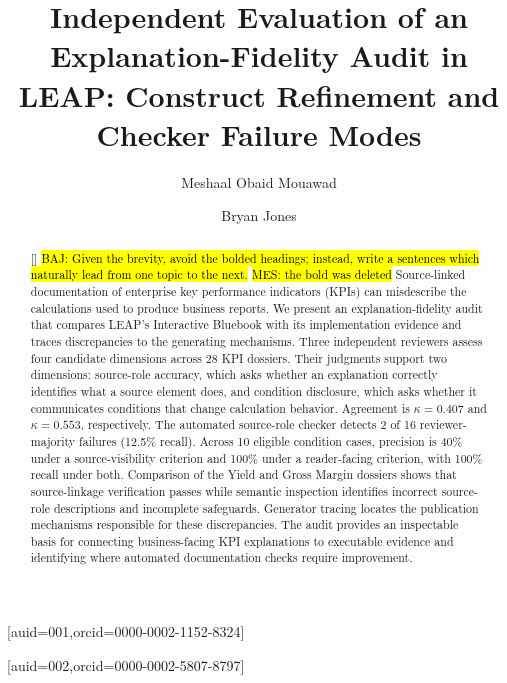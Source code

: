 \documentclass[a4paper,fleqn]{cas-dc}
\newcommand{\baj}[1]{{\sethlcolor{yellow}\hl{BAJ: #1}}}
\newcommand{\mes}[1]{{\sethlcolor{orange}\hl{MES: #1}}}
\begin{document}
\let\WriteBookmarks\relax
\def\floatpagepagefraction{1}
\def\textpagefraction{.001}


\title[mode=title]{Independent Evaluation of an Explanation-Fidelity Audit in LEAP: Construct Refinement and Checker Failure Modes}

\author[1]{Meshaal Obaid Mouawad}[auid=001,orcid=0000-0002-1152-8324]
\cormark[1]

\author[1]{Bryan Jones}[auid=002,orcid=0000-0002-5807-8797]


\begin{abstract}[]
\baj{Given the brevity, avoid the bolded headings; instead, write a sentences which naturally lead from one topic to the next.}
\mes{the bold was deleted}
Source-linked documentation of enterprise key performance indicators (KPIs) can misdescribe the calculations used to produce business reports. We present an explanation-fidelity audit that compares LEAP's Interactive Bluebook with its implementation evidence and traces discrepancies to the generating mechanisms. Three independent reviewers assess four candidate dimensions across 28 KPI dossiers. Their judgments support two dimensions: source-role accuracy, which asks whether an explanation correctly identifies what a source element does, and condition disclosure, which asks whether it communicates conditions that change calculation behavior. Agreement is $\kappa=0.407$ and $\kappa=0.553$, respectively. The automated source-role checker detects 2 of 16 reviewer-majority failures (12.5\% recall). Across 10 eligible condition cases, precision is 40\% under a source-visibility criterion and 100\% under a reader-facing criterion, with 100\% recall under both. Comparison of the Yield and Gross Margin dossiers shows that source-linkage verification passes while semantic inspection identifies incorrect source-role descriptions and incomplete safeguards. Generator tracing locates the publication mechanisms responsible for these discrepancies. The audit provides an inspectable basis for connecting business-facing KPI explanations to executable evidence and identifying where automated documentation checks require improvement.
\end{abstract}
\end{document}
